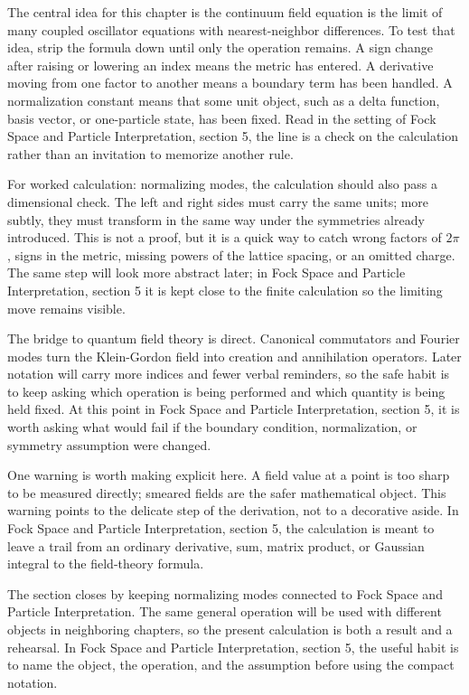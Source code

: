 The central idea for this chapter is the continuum field equation is the limit of many coupled oscillator equations with nearest-neighbor differences.  To test that idea, strip the formula down until only the operation remains.  A sign change after raising or lowering an index means the metric has entered.  A derivative moving from one factor to another means a boundary term has been handled.  A normalization constant means that some unit object, such as a delta function, basis vector, or one-particle state, has been fixed.  Read in the setting of Fock Space and Particle Interpretation, section 5, the line is a check on the calculation rather than an invitation to memorize another rule.

For worked calculation: normalizing modes, the calculation should also pass a dimensional check.  The left and right sides must carry the same units; more subtly, they must transform in the same way under the symmetries already introduced.  This is not a proof, but it is a quick way to catch wrong factors of \(2\pi\), signs in the metric, missing powers of the lattice spacing, or an omitted charge.  The same step will look more abstract later; in Fock Space and Particle Interpretation, section 5 it is kept close to the finite calculation so the limiting move remains visible.

The bridge to quantum field theory is direct.  Canonical commutators and Fourier modes turn the Klein-Gordon field into creation and annihilation operators.  Later notation will carry more indices and fewer verbal reminders, so the safe habit is to keep asking which operation is being performed and which quantity is being held fixed.  At this point in Fock Space and Particle Interpretation, section 5, it is worth asking what would fail if the boundary condition, normalization, or symmetry assumption were changed.

One warning is worth making explicit here.  A field value at a point is too sharp to be measured directly; smeared fields are the safer mathematical object.  This warning points to the delicate step of the derivation, not to a decorative aside.  In Fock Space and Particle Interpretation, section 5, the calculation is meant to leave a trail from an ordinary derivative, sum, matrix product, or Gaussian integral to the field-theory formula.

The section closes by keeping normalizing modes connected to Fock Space and Particle Interpretation.  The same general operation will be used with different objects in neighboring chapters, so the present calculation is both a result and a rehearsal.  In Fock Space and Particle Interpretation, section 5, the useful habit is to name the object, the operation, and the assumption before using the compact notation.



